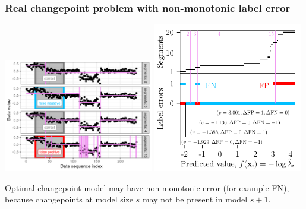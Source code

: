 \documentclass{beamer}
\begin{document}
\begin{frame}
  \frametitle{Real changepoint problem with non-monotonic label error}

  \includegraphics[width=0.49\textwidth]{figure-fn-not-monotonic}
  \includegraphics[width=0.49\textwidth]{figure-fn-not-monotonic-error-standAlone}

  Optimal changepoint model may have non-monotonic error (for example
  FN), because changepoints at model size $s$ may not be present in
  model $s+1$.

\end{frame}
\end{document}
